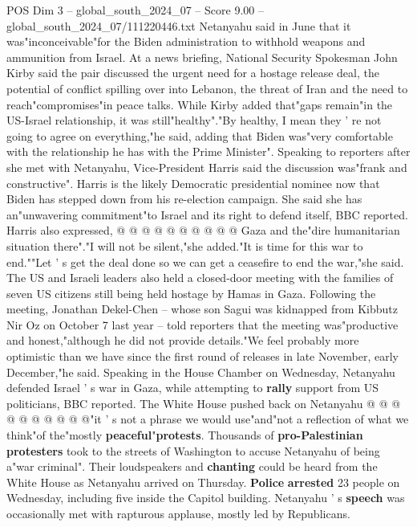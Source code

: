 \begin{textsample}{POS Dim 3 – global\_south\_2024\_07 – Score 9.00 – global\_south\_2024\_07/111220446.txt}  \label{ex:f3_pos_314}
Netanyahu said in June that it was"inconceivable"for the Biden administration to withhold weapons and ammunition from Israel.
At a news briefing, National Security Spokesman John Kirby said the pair discussed the urgent need for a hostage release deal, the potential of conflict spilling over into Lebanon, the threat of Iran and the need to reach"compromises"in peace talks.
While Kirby added that"gaps remain"in the US-Israel relationship, it was still"healthy"."By healthy, I mean they ' re not going to agree on everything,"he said, adding that Biden was"very comfortable with the relationship he has with the Prime Minister".
Speaking to reporters after she met with Netanyahu, Vice-President Harris said the discussion was"frank and constructive".
Harris is the likely Democratic presidential nominee now that Biden has stepped down from his re-election campaign.
She said she has an"unwavering commitment"to Israel and its right to defend itself, BBC reported.
Harris also expressed, @ @ @ @ @ @ @ @ @ @ Gaza and the"dire humanitarian situation there"."I will not be silent,"she added."It is time for this war to end.""Let ' s get the deal done so we can get a ceasefire to end the war,"she said.
The US and Israeli leaders also held a closed-door meeting with the families of seven US citizens still being held hostage by Hamas in Gaza.
Following the meeting, Jonathan Dekel-Chen -- whose son Sagui was kidnapped from Kibbutz Nir Oz on October 7 last year -- told reporters that the meeting was"productive and honest,"although he did not provide details."We feel probably more optimistic than we have since the first round of releases in late November, early December,"he said.
Speaking in the House Chamber on Wednesday, Netanyahu defended Israel ' s war in Gaza, while attempting to \textbf{rally} support from US politicians, BBC reported.
The White House pushed back on Netanyahu @ @ @ @ @ @ @ @ @ @"it ' s not a phrase we would use"and"not a reflection of what we think"of the"mostly \textbf{peaceful}"\textbf{protests}.
Thousands of \textbf{pro-Palestinian} \textbf{protesters} took to the streets of Washington to accuse Netanyahu of being a"war criminal".
Their loudspeakers and \textbf{chanting} could be heard from the White House as Netanyahu arrived on Thursday. \textbf{Police} \textbf{arrested} 23 people on Wednesday, including five inside the Capitol building.
Netanyahu ' s \textbf{speech} was occasionally met with rapturous applause, mostly led by Republicans.

\end{textsample}
